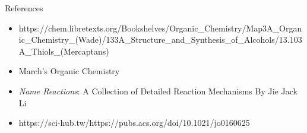 \documentclass[notes]{beamer}
\begin{document}
\begin{frame}{References}
\begin{itemize}
    \item https://chem.libretexts.org/Bookshelves/Organic_Chemistry/Map3A_Organic_Chemistry_(Wade)/133A_Structure_and_Synthesis_of_Alcohols/13.103A_Thiols_(Mercaptans)
    \item 
    March's Organic Chemistry
    \item
    \textit{Name Reactions}: A Collection of Detailed Reaction Mechanisms
By Jie Jack Li
    \item
    https://sci-hub.tw/https://pubs.acs.org/doi/10.1021/jo0160625
    
\end{itemize}
    
\end{frame}


 
\end{document}
